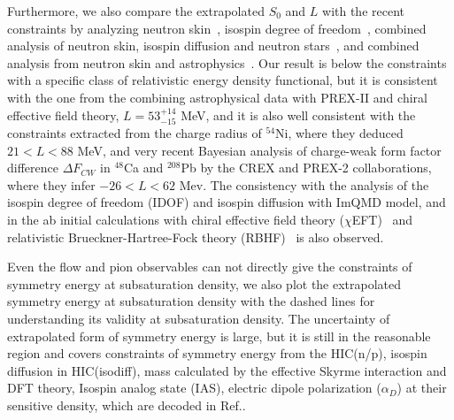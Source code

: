 \documentclass[reprint,aps,prc,twocolumn,superscriptaddress]{revtex4-1}
\begin{document}
Furthermore, we also compare the extrapolated $S_0$ and $L$ with the recent constraints by analyzing neutron skin~\cite{Reed21PRL,Pineda2021PRL,Essick21,ZhenZhang2022ARXIV}, isospin degree of freedom~\cite{Yanzhang2017PRC}, combined analysis of neutron skin, isospin diffusion and neutron stars~\cite{YXZhang2020PRC}, and combined analysis from neutron skin and astrophysics~\cite{Essick2021PRC}. Our result is below the constraints with a specific class of relativistic energy density functional\cite{Reed2021PRL}, but it is consistent with the one from the combining astrophysical data with PREX-II and chiral effective field theory, $L=53^{+14}_{-15}$ MeV\cite{Essick21}, and it is also well consistent with the constraints extracted from the charge radius of $^{54}$Ni, where they deduced $21<L<88$ MeV\cite{Pineda2021PRL}, and very recent Bayesian analysis of charge-weak form factor difference $\Delta F_{CW}$ in $^{48}$Ca and $^{208}$Pb by the CREX and PREX-2 collaborations, where they infer $-26<L<62$ Mev\cite{ZhenZhang2022ARXIV}. The consistency with the analysis of the isospin degree of freedom (IDOF) and isospin diffusion with ImQMD model\cite{Yanzhang2017PRC,YXZhang2020PRC}, and in the ab initial calculations with chiral effective field theory ($\chi$EFT)~\cite{Drischler2020PRL} and relativistic Brueckner-Hartree-Fock theory (RBHF)~\cite{SiboWang2022} is also observed.

Even the flow and pion observables can not directly give the constraints of symmetry energy at subsaturation density, we also plot the extrapolated symmetry energy at subsaturation density with the dashed lines for understanding its validity at subsaturation density. The uncertainty of extrapolated form of symmetry energy is large, but it is still in the reasonable region and covers constraints of symmetry energy from the HIC(n/p)\cite{Morfouace2019PLB}, isospin diffusion in HIC(isodiff)\cite{Tsang2008PRL}, mass calculated by the effective Skyrme interaction\cite{Brown2013PRL} and DFT theory\cite{Kortelainen2011PRC}, Isospin analog state (IAS)\cite{Danielewicz2016NPA}, electric dipole polarization ($\alpha_D$)\cite{Zhang2015PRC} at their sensitive density, which are decoded in Ref.\cite{Lynch2022PLB}.
\end{document}
